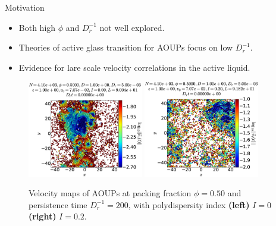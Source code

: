 \documentclass{beamer}
\begin{document}
\begin{frame}{Motivation}

\begin{itemize}
  \item Both high $\phi$ and $D_r^{-1}$ not well explored.
  \item Theories of active glass transition for AOUPs focus on low $D_r^{-1}$.
  \item Evidence for lare scale velocity correlations in the active liquid.
\end{itemize}

\begin{figure}
\centering
\includegraphics[width=0.45\textwidth]{No4096_Fl1000_Vl0000_Tl1000_Ri5000_Dk5000_EL3000.velo.eps}
\includegraphics[width=0.45\textwidth]{No4096_Fl1000_Vl0000_Tl1000_Ri5000_Dk5000_El2000.velo.eps}
\caption{Velocity maps of AOUPs at packing fraction $\phi = 0.50$ and persistence time $D_r^{-1} = 200$, with polydispersity index {\bf (left)} $I = 0$ {\bf (right)} $I = 0.2$.}
\end{figure}


\end{frame}
\end{document}
